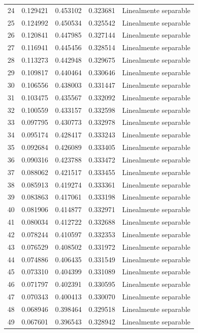 \begin{tabular}{lllll}
24 & 0.129421 & 0.453102 & 0.323681 & Linealmente separable \\
25 & 0.124992 & 0.450534 & 0.325542 & Linealmente separable \\
26 & 0.120841 & 0.447985 & 0.327144 & Linealmente separable \\
27 & 0.116941 & 0.445456 & 0.328514 & Linealmente separable \\
28 & 0.113273 & 0.442948 & 0.329675 & Linealmente separable \\
29 & 0.109817 & 0.440464 & 0.330646 & Linealmente separable \\
30 & 0.106556 & 0.438003 & 0.331447 & Linealmente separable \\
31 & 0.103475 & 0.435567 & 0.332092 & Linealmente separable \\
32 & 0.100559 & 0.433157 & 0.332598 & Linealmente separable \\
33 & 0.097795 & 0.430773 & 0.332978 & Linealmente separable \\
34 & 0.095174 & 0.428417 & 0.333243 & Linealmente separable \\
35 & 0.092684 & 0.426089 & 0.333405 & Linealmente separable \\
36 & 0.090316 & 0.423788 & 0.333472 & Linealmente separable \\
37 & 0.088062 & 0.421517 & 0.333455 & Linealmente separable \\
38 & 0.085913 & 0.419274 & 0.333361 & Linealmente separable \\
39 & 0.083863 & 0.417061 & 0.333198 & Linealmente separable \\
40 & 0.081906 & 0.414877 & 0.332971 & Linealmente separable \\
41 & 0.080034 & 0.412722 & 0.332688 & Linealmente separable \\
42 & 0.078244 & 0.410597 & 0.332353 & Linealmente separable \\
43 & 0.076529 & 0.408502 & 0.331972 & Linealmente separable \\
44 & 0.074886 & 0.406435 & 0.331549 & Linealmente separable \\
45 & 0.073310 & 0.404399 & 0.331089 & Linealmente separable \\
46 & 0.071797 & 0.402391 & 0.330595 & Linealmente separable \\
47 & 0.070343 & 0.400413 & 0.330070 & Linealmente separable \\
48 & 0.068946 & 0.398464 & 0.329518 & Linealmente separable \\
49 & 0.067601 & 0.396543 & 0.328942 & Linealmente separable \\

\end{tabular}
